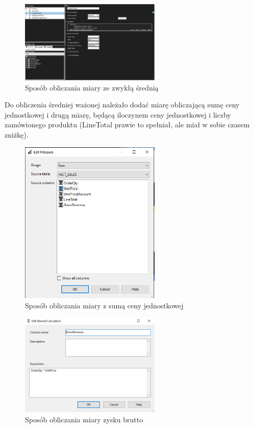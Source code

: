 \documentclass[a4paper,12pt]{article}
\begin{document}
\begin{figure}[H]
  \includegraphics[width=0.6\textwidth]{images/3_calculations_1.png}
  \caption{Sposób obliczania miary ze zwykłą średnią}
\end{figure}

Do obliczenia średniej ważonej należało dodać miarę obliczającą sumę ceny jednostkowej i drugą miarę, będącą iloczynem ceny jednostkowej i liczby zamówionego produktu (LineTotal prawie to spełniał, ale miał w sobie czasem zniżkę).

\begin{figure}[H]
  \includegraphics[width=0.6\textwidth]{images/3_sum_unit_price.png}
  \caption{Sposób obliczania miary z sumą ceny jednostkowej}
\end{figure}

\begin{figure}[H]
  \includegraphics[width=0.6\textwidth]{images/3_gross_revenue.png}
  \caption{Sposób obliczania miary zysku brutto}
\end{figure}
\end{document}
